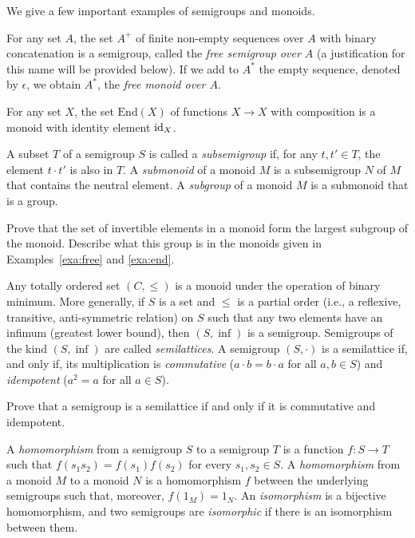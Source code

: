 We give a few important examples of semigroups and monoids.
\begin{example}\label{exa:free}
  For any set $A$, the set $A^+$ of finite non-empty sequences over $A$ with binary concatenation is a semigroup, called the \emph{free semigroup over $A$} (a justification for this name will be provided below). If we add to $A^*$ the empty sequence, denoted by $\epsilon$, we obtain $A^*$, the \emph{free monoid over $A$}.
\end{example}
\begin{example}\label{exa:end}
For any set $X$, the set $\mathrm{End}(X)$ of functions $X \to X$ with composition is a monoid with identity element $\mathrm{id}_X$.
\end{example}

\begin{definition}
  A subset $T$ of a semigroup $S$ is called a \emph{subsemigroup} if, for any $t, t' \in T$, the element $t \cdot t'$ is also in $T$.  A \emph{submonoid} of a monoid $M$ is a subsemigroup $N$ of $M$ that contains the neutral element. A \emph{subgroup} of a monoid $M$ is a submonoid that is a group.
\end{definition}
\begin{exercise}\easy
 Prove that the set of invertible elements in a monoid form the largest subgroup of the monoid. Describe what this group is in the monoids given in Examples~\ref{exa:free} and \ref{exa:end}.
\end{exercise}

\begin{example}
Any totally ordered set $(C, \leq)$ is a monoid under the operation of binary minimum. More generally, if $S$ is a set and $\leq$ is a partial order (i.e., a reflexive, transitive, anti-symmetric relation) on $S$ such that any two elements have an infimum (greatest lower bound), then $(S, \inf)$ is a semigroup. Semigroups of the kind $(S, \inf)$ are called \emph{semilattices}. A semigroup $(S, \cdot)$ is a semilattice if, and only if, its multiplication is \emph{commutative} ($a \cdot b = b \cdot a$ for all $a,b \in S$) and \emph{idempotent} ($a^2 = a$ for all $a \in S$).
\end{example}

\begin{exercise} \easy
  Prove that a semigroup is a semilattice if and only if it is commutative and idempotent.
\end{exercise}

\begin{definition}
  A \emph{homomorphism} from a semigroup $S$ to a semigroup $T$ is a function $f \colon S \to T$ such that $f(s_1s_2) = f(s_1)f(s_2)$ for every $s_1, s_2 \in S$.  
% 
 A \emph{homomorphism} from a monoid $M$ to a monoid $N$ is a homomorphism $f$ between the underlying semigroups such that, moreover, $f(1_M) = 1_N$. An \emph{isomorphism} is a bijective homomorphism, and two semigroups are \emph{isomorphic} if there is an isomorphism between them.
\end{definition}


